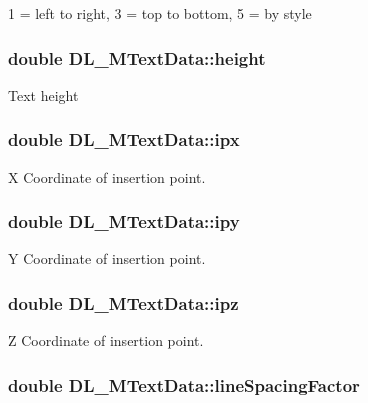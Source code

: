 1 = left to right, 3 = top to bottom, 5 = by style \hypertarget{structDL__MTextData_af83188d35269d20e8932411ddaf1c3f8}{
\subsubsection[{height}]{\setlength{\rightskip}{0pt plus 5cm}double D\-L\-\_\-\-M\-Text\-Data\-::height}}\label{structDL__MTextData_af83188d35269d20e8932411ddaf1c3f8}
Text height \hypertarget{structDL__MTextData_a7a84e7b5b4c20640c79106b05d79b6ee}{
\subsubsection[{ipx}]{\setlength{\rightskip}{0pt plus 5cm}double D\-L\-\_\-\-M\-Text\-Data\-::ipx}}\label{structDL__MTextData_a7a84e7b5b4c20640c79106b05d79b6ee}
X Coordinate of insertion point. \hypertarget{structDL__MTextData_aa0218b8bff8598c76780f44243fc5887}{
\subsubsection[{ipy}]{\setlength{\rightskip}{0pt plus 5cm}double D\-L\-\_\-\-M\-Text\-Data\-::ipy}}\label{structDL__MTextData_aa0218b8bff8598c76780f44243fc5887}
Y Coordinate of insertion point. \hypertarget{structDL__MTextData_a384d83a52321c544d788042c38c383d7}{
\subsubsection[{ipz}]{\setlength{\rightskip}{0pt plus 5cm}double D\-L\-\_\-\-M\-Text\-Data\-::ipz}}\label{structDL__MTextData_a384d83a52321c544d788042c38c383d7}
Z Coordinate of insertion point. \hypertarget{structDL__MTextData_a3ddfff66e486aaf4eb9541b0552b7023}{
\subsubsection[{line\-Spacing\-Factor}]{\setlength{\rightskip}{0pt plus 5cm}double D\-L\-\_\-\-M\-Text\-Data\-::line\-Spacing\-Factor}}\label{structDL__MTextData_a3ddfff66e486aaf4eb9541b0552b7023}
